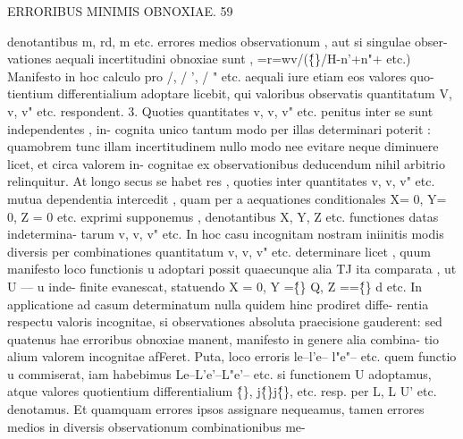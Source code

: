 \documentclass[12pt,a4paper]{article}
\begin{document}
\newpage
\begin{center}
\textsc{ERRORIBUS MINIMIS OBNOXIAE. 59}
\end{center}
denotantibus m, rd, m etc. errores medios observationum , aut si singulae obser-
vationes aequali incertitudini obnoxiae sunt ,
=r=wv/(\^\{\}/H-n'+n"+ etc.)
Manifesto in hoc calculo pro /, / ', / " etc. aequali iure etiam eos valores quo-
tientium differentialium adoptare licebit, qui valoribus observatis quantitatum
V, v, v" etc. respondent.
3.
Quoties quantitates v, v, v" etc. penitus inter se sunt independentes , in-
cognita unico tantum modo per illas determinari poterit : quamobrem tunc illam
incertitudinem nullo modo nee evitare neque diminuere licet, et circa valorem in-
cognitae ex observationibus deducendum nihil arbitrio relinquitur.
At longo secus se habet res , quoties inter quantitates v, v, v" etc. mutua
dependentia intercedit , quam per a aequationes conditionales
X= 0, Y= 0, Z = 0 etc.
exprimi supponemus , denotantibus X, Y, Z etc. functiones datas indetermina-
tarum v, v, v" etc. In hoc casu incognitam nostram iniinitis modis diversis per
combinationes quantitatum v, v, v" etc. determinare licet , quum manifesto loco
functionis u adoptari possit quaecunque alia TJ ita comparata , ut U --- u inde-
finite evanescat, statuendo X = 0, Y =\^\{\} Q, Z ==\^\{\} d etc.
In applicatione ad casum determinatum nulla quidem hinc prodiret diffe-
rentia respectu valoris incognitae, si observationes absoluta praecisione gauderent:
sed quatenus hae erroribus obnoxiae manent, manifesto in genere alia combina-
tio alium valorem incognitae afFeret. Puta, loco erroris
le--l'e-- l"e"-- etc.
quem functio u commiserat, iam habebimus
Le--L'e'--L"e'-- etc.
si functionem U adoptamus, atque valores quotientium differentialium \^\{\}, j\^\{\}\glqq  j\^\{\},
etc. resp. per L, L U' etc. denotamus. Et quamquam errores ipsos assignare
nequeamus, tamen errores medios in diversis observationum combinationibus me-
\end{document}
